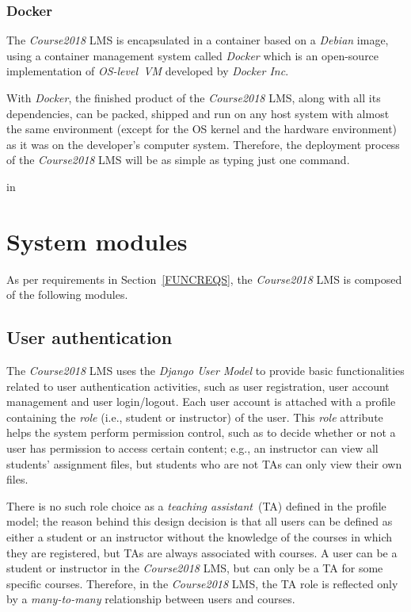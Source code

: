 \subsubsection{Docker}
The \emph{Course2018} LMS is encapsulated in a container based on a
\emph{Debian} image, using a container management system called \emph{Docker}
which is an open-source implementation of \emph{OS-level~VM} developed by
\emph{Docker Inc}.

\medskip

With \emph{Docker}, the finished product of the
\emph{Course2018} LMS, along with all its dependencies, can be packed, shipped
and run on any host system with almost the same environment
(except for the OS kernel and the hardware environment)
as it was on the
developer's computer system. Therefore, the deployment process of the
\emph{Course2018} LMS will be as simple as typing just one command.

 in


\section{System modules}

As per requirements in Section~\ref{FUNCREQS}, the \emph{Course2018} LMS is
composed of the following modules.

\subsection{User authentication}
\label{sec:USRAUTH}
The \emph{Course2018} LMS uses the \emph{Django User Model} \cite{FdjangoUser}
to provide
basic functionalities related to user authentication activities, such as
user registration, user account management and user login/logout.
Each user account is attached with a profile containing the \emph{role}
(i.e., student or instructor) of the user. This \emph{role} attribute helps
the system perform permission control, such as to
decide whether or not a user has permission to access certain content;
e.g., an instructor can view all students' assignment
files, but students who are not TAs can only view their own files.

\medskip

There is no such role choice as a \emph{teaching assistant}~(TA) defined in the
profile model;
the reason behind this design decision is that all users can be defined as either a
student or an instructor without the knowledge of the courses in which they are
registered, but TAs are always associated with courses.
A user
can be a student or instructor in the \emph{Course2018} LMS, but can only
be a TA for some specific courses.
Therefore, in the \emph{Course2018} LMS, the TA role is
reflected only by a \emph{many-to-many} relationship between users and courses.

